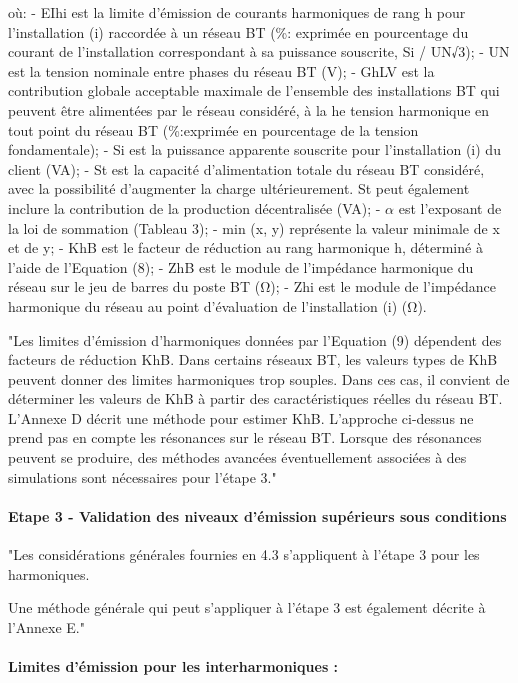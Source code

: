 où:
- EIhi est la limite d'émission de courants harmoniques de rang h pour l'installation (i) raccordée à un réseau BT (\%: exprimée en pourcentage du courant de l'installation correspondant à sa puissance souscrite, Si / UN√3);
- UN est la tension nominale entre phases du réseau BT (V);
- GhLV est la contribution globale acceptable maximale de l'ensemble des installations BT qui peuvent être alimentées par le réseau considéré, à la he tension harmonique en tout point du réseau BT (\%:exprimée en pourcentage de la tension fondamentale);
- Si est la puissance apparente souscrite pour l'installation (i) du client (VA);
- St est la capacité d'alimentation totale du réseau BT considéré, avec la possibilité d'augmenter la charge ultérieurement. St peut également inclure la contribution de la production décentralisée (VA);
- $\alpha$ est l'exposant de la loi de sommation (Tableau 3);
- min (x, y) représente la valeur minimale de x et de y;
- KhB est le facteur de réduction au rang harmonique h, déterminé à l'aide de l'Equation (8);
- ZhB est le module de l'impédance harmonique du réseau sur le jeu de barres du poste BT (Ω);
- Zhi est le module de l'impédance harmonique du réseau au point d'évaluation de l'installation (i) (Ω).

"Les limites d'émission d'harmoniques données par l'Equation (9) dépendent des facteurs de réduction KhB. Dans certains réseaux BT, les valeurs types de KhB peuvent donner des limites harmoniques trop souples. Dans ces cas, il convient de déterminer les valeurs de KhB à partir des caractéristiques réelles du réseau BT. L'Annexe D décrit une méthode pour estimer KhB. L'approche ci-dessus ne prend pas en compte les résonances sur le réseau BT. Lorsque des résonances peuvent se produire, des méthodes avancées éventuellement associées à des simulations sont nécessaires pour l'étape 3."

\paragraph{Etape 3 - Validation des niveaux d'émission supérieurs sous conditions}

"Les considérations générales fournies en 4.3 s'appliquent à l'étape 3 pour les harmoniques.

Une méthode générale qui peut s'appliquer à l'étape 3 est également décrite à l'Annexe E."

\paragraph{Limites d'émission pour les interharmoniques :}

